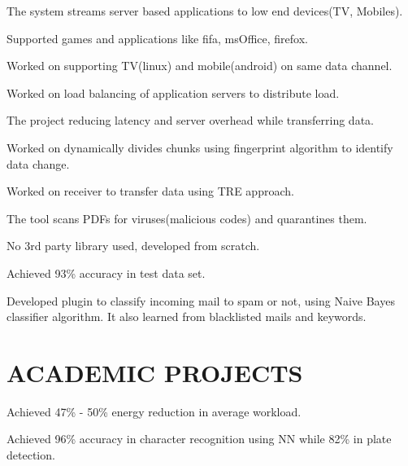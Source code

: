 \documentclass[]{deedy-resume-openfont}
\begin{document}
\begin{minipage}[t]{0.65\textwidth}
\location{}
\begin{tightemize}
\item The system streams server based applications to low end devices(TV, Mobiles).
\item Supported games and applications like fifa, msOffice, firefox.
\item Worked on supporting TV(linux) and mobile(android) on same data channel.
\item Worked on load balancing of application servers to distribute load.
\end{tightemize}
\sectionsep

\location{}
\begin{tightemize}
\item The project reducing latency and server overhead while transferring data.
\item Worked on dynamically divides chunks using fingerprint algorithm to identify data change.
\item Worked on receiver to transfer data using TRE approach.
\end{tightemize}
\sectionsep

\location{}
\begin{tightemize}
\item The tool scans PDFs for viruses(malicious codes) and quarantines them.
\item No 3rd party library used, developed from scratch.
\item Achieved 93\% accuracy in test data set.
\end{tightemize}
\sectionsep

\location{}
\begin{tightemize}
\item Developed plugin to classify incoming mail to spam or not, using Naive Bayes classifier algorithm.  It also learned from blacklisted mails and keywords.
\end{tightemize}
\sectionsep

\section{ACADEMIC PROJECTS}
\location{}
\begin{tightemize}
\item Achieved 47\% - 50\% energy reduction in average workload.  
\end{tightemize}
\sectionsep

\begin{tightemize}
\item Achieved 96\% accuracy in character recognition using NN while 82\% in plate detection.
\end{tightemize}
\sectionsep


\end{minipage} 
\end{document}
